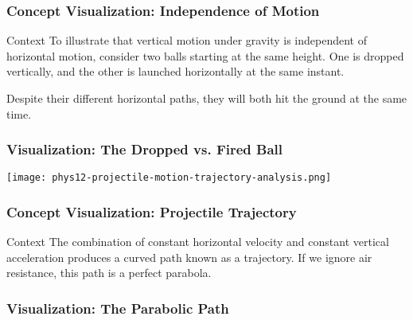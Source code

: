 \documentclass{beamer}
\begin{document}
\begin{frame}
\frametitle{Concept Visualization: Independence of Motion}
\begin{block}{Context}
To illustrate that vertical motion under gravity is independent of horizontal motion, consider two balls starting at the same height. One is dropped vertically, and the other is launched horizontally at the same instant.
\end{block}
\vspace{1em}
\begin{center}
Despite their different horizontal paths, they will both hit the ground at the same time.
\end{center}
\end{frame}

\begin{frame}
\frametitle{Visualization: The Dropped vs. Fired Ball}
\centering
\texttt{[image: phys12-projectile-motion-trajectory-analysis.png]}
\end{frame}

\begin{frame}
\frametitle{Concept Visualization: Projectile Trajectory}
\begin{block}{Context}
The combination of constant horizontal velocity and constant vertical acceleration produces a curved path known as a \alert{trajectory}. If we ignore air resistance, this path is a perfect \alert{parabola}.
\end{block}
\end{frame}

\begin{frame}
\frametitle{Visualization: The Parabolic Path}
\begin{figure}
\end{figure}
\end{frame}
\end{document}
